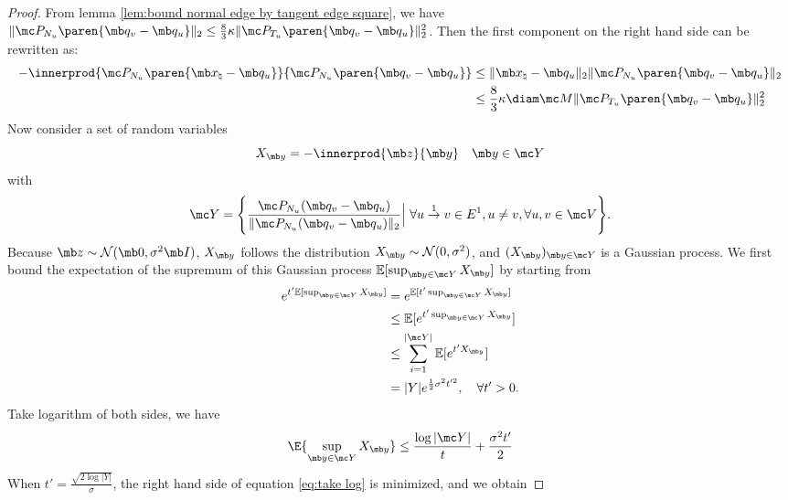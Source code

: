\begin{proof}
From lemma \ref{lem:bound normal edge by tangent edge square}, we have $\| \mc P_{N_u} \paren{\mb q_v - \mb q_u} \|_2 \leq \frac{8}{3} \kappa \| \mc P_{T_u} \paren{\mb q_v - \mb q_u} \|_2^2$.
Then the first component on the right hand side can be rewritten as:
\begin{equation}\label{eq:bound signal component in normal term}
    \begin{aligned}
         - \innerprod{\mc P_{N_u} \paren{\mb x_\natural - \mb q_u}}{\mc P_{N_u} \paren{\mb q_v - \mb q_u}}
         &\leq \| \mb x_\natural - \mb q_u \|_2 \| \mc P_{N_u} \paren{\mb q_v - \mb q_u} \|_2\\
         &\leq \frac{8}{3} \kappa \diam \mc M \| \mc P_{T_u} \paren{\mb q_v - \mb q_u} \|_2^2
    \end{aligned}
\end{equation}
Now consider a set of random variables 
\begin{equation}
    X_{\mb y} = - \innerprod{\mb z}{\mb y} \quad \mb y \in \mc Y
\end{equation}
with \[\mc Y = \Biggl\{ \frac{\mc P_{N_{u}} (\mb q_v - \mb q_u)}{\| \mc P_{N_{u}} (\mb q_v - \mb q_u) \|_2} \Big\vert \ \forall u \overset{1}{\rightarrow} v \in E^1, u \ne v,  \forall u, v \in \mc V \Biggl\}.\] 
Because $\mb z \sim \mathcal{N}(\mb 0, \sigma^2 \mb I)$, $X_{\mb y}$ follows the distribution $X_{\mb y} \sim \mathcal{N}(0, \sigma^2)$, and $(X_{\mb y})_{\mb y \in \mc Y}$ is a Gaussian process. We first bound the expectation of the supremum of this Gaussian process $ \mathbb E [\sup_{\mb y \in \mc Y} X_{\mb y}]$ by starting from
\begin{equation}
    \begin{aligned}
        e^{t' \mathbb E[\sup_{\mb y \in \mc Y} X_{\mb y}]}
        &= e^{\mathbb E[t'\sup_{\mb y \in \mc Y} X_{\mb y}]}\\
        &\leq \mathbb E[e^{t' \sup_{\mb y \in \mc Y} X_{\mb y}}] \\
        &\leq \sum_{i=1}^{|\mc Y|} \mathbb E[e^{t' X_{\mb y}}] \\
        &= |Y| e^{\frac{1}{2}\sigma^2 t'^2}, \quad \forall t' > 0. 
    \end{aligned}
\end{equation}
Take logarithm of both sides, we have
\begin{equation}\label{eq:take log}
    \E{\sup_{\mb y \in \mc Y} X_{\mb y}}
    \leq \frac{\log|\mc Y|}{t} + \frac{ \sigma^2 t'}{2}
\end{equation}
When $t' = \frac{\sqrt{2 \log |Y|}}{\sigma}$, the right hand side of equation \eqref{eq:take log} is minimized, and we obtain

\end{proof}
